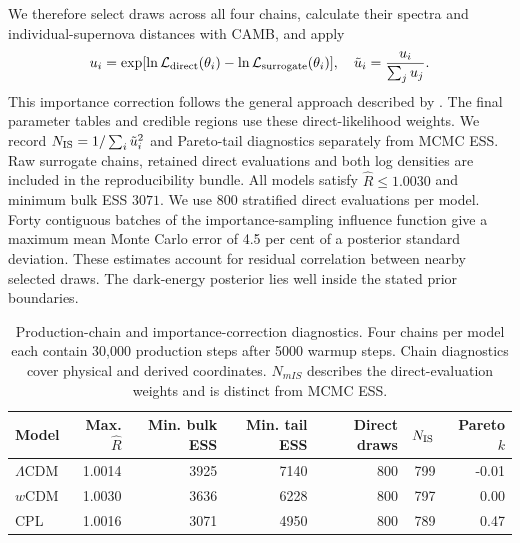 \documentclass[fleqn,usenatbib]{mnras}
\begin{document}
We therefore select draws across all four chains, calculate their spectra and
individual-supernova distances with CAMB, and apply
\begin{equation}
 u_i=\exp[\ln\mathcal L_{\rm direct}(\theta_i)
                 -\ln\mathcal L_{\rm surrogate}(\theta_i)],\quad
 \tilde u_i=\frac{u_i}{\sum_j u_j}.
\end{equation}
This importance correction follows the general approach described by
\citet{LewisBridle}. The final parameter tables and credible regions use these
direct-likelihood weights. We record $N_{\rm IS}=1/\sum_i\tilde u_i^2$ and
Pareto-tail diagnostics separately from MCMC ESS. Raw surrogate chains,
retained direct evaluations and both log densities are included in the
reproducibility bundle. All models satisfy $\widehat R\leq1.0030$ and minimum bulk ESS $3071$. We use 800 stratified direct evaluations per model. Forty contiguous batches of the importance-sampling influence function give a maximum mean Monte Carlo error of 4.5 per cent of a posterior standard deviation. These estimates account for residual correlation between nearby selected draws. The dark-energy posterior lies well inside the stated prior boundaries.

\begin{table}\centering
\caption{Production-chain and importance-correction diagnostics. Four chains per model each contain 30,000 production steps after 5000 warmup steps. Chain diagnostics cover physical and derived coordinates. $N_{
m IS}$ describes the direct-evaluation weights and is distinct from MCMC ESS.}\label{tab:diagnostics}
\begin{tabular}{lrrrrrr}\toprule
Model & Max. $\widehat R$ & Min. bulk ESS & Min. tail ESS & Direct draws & $N_{\rm IS}$ & Pareto $k$\\\midrule
$\Lambda$CDM & 1.0014 & 3925 & 7140 & 800 & 799 & -0.01\\
$w$CDM & 1.0030 & 3636 & 6228 & 800 & 797 & 0.00\\
CPL & 1.0016 & 3071 & 4950 & 800 & 789 & 0.47\\
\bottomrule\end{tabular}
\end{table}
\end{document}
